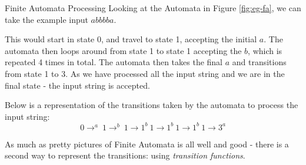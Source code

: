 \begin{example}{Finite Automata Processing}
Looking at the Automata in Figure \ref{fig:eg-fa}, we can take the example input $abbbba$.

This would start in state 0, and travel to state 1, accepting the initial $a$. The automata then loops around from state 1 to state 1 accepting the $b$, which is repeated 4 times in total. The automata then takes the final $a$ and transitions from state 1 to 3. As we have processed all the input string and we are in the final state - the input string is accepted.

Below is a representation of the transitions taken by the automata to process the input string:
\[0 \rightarrow ^a\ 1 \rightarrow ^b\ 1 \rightarrow 1 ^b\ 1 \rightarrow 1 ^b\ 1 \rightarrow 1 ^b\ 1 \rightarrow 3 ^a\]
\end{example}

As much as pretty pictures of Finite Automata is all well and good - there is a second way to represent the transitions: using \textit{transition functions}.